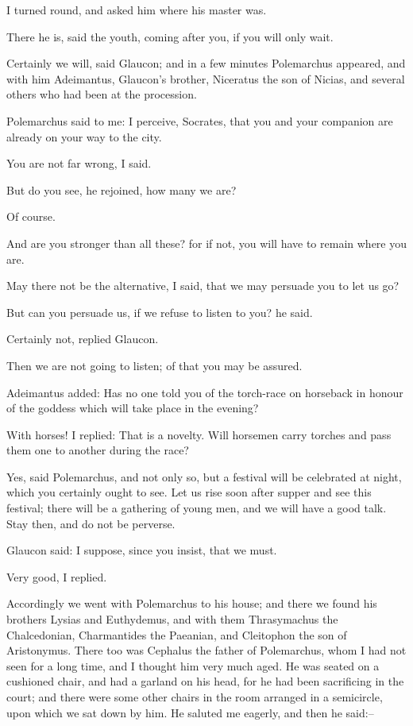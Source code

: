 I turned round, and asked him where his master was.

There he is, said the youth, coming after you, if you will only wait.

Certainly we will, said Glaucon; and in a few minutes Polemarchus
appeared, and with him Adeimantus, Glaucon's brother, Niceratus the son
of Nicias, and several others who had been at the procession.

Polemarchus said to me: I perceive, Socrates, that you and your
companion are already on your way to the city.

You are not far wrong, I said.

But do you see, he rejoined, how many we are?

Of course.

And are you stronger than all these? for if not, you will have to remain
where you are.

May there not be the alternative, I said, that we may persuade you to
let us go?

But can you persuade us, if we refuse to listen to you? he said.

Certainly not, replied Glaucon.

Then we are not going to listen; of that you may be assured.

Adeimantus added: Has no one told you of the torch-race on horseback in
honour of the goddess which will take place in the evening?

With horses! I replied: That is a novelty. Will horsemen carry torches
and pass them one to another during the race?

Yes, said Polemarchus, and not only so, but a festival will be
celebrated at night, which you certainly ought to see. Let us rise soon
after supper and see this festival; there will be a gathering of young
men, and we will have a good talk. Stay then, and do not be perverse.

Glaucon said: I suppose, since you insist, that we must.

Very good, I replied.

Accordingly we went with Polemarchus to his house; and there we found
his brothers Lysias and Euthydemus, and with them Thrasymachus the
Chalcedonian, Charmantides the Paeanian, and Cleitophon the son of
Aristonymus. There too was Cephalus the father of Polemarchus, whom I
had not seen for a long time, and I thought him very much aged. He was
seated on a cushioned chair, and had a garland on his head, for he had
been sacrificing in the court; and there were some other chairs in the
room arranged in a semicircle, upon which we sat down by him. He saluted
me eagerly, and then he said:--

